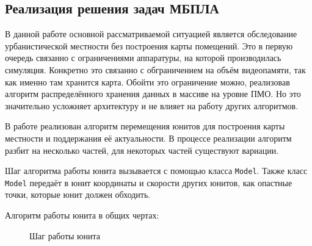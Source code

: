 \subsection{Реализация решения задач МБПЛА}

В данной работе основной рассматриваемой ситуацией является обследование
урбанистической местности без построения карты помещений. Это в первую
очередь связанно с ограничениями аппаратуры, на которой производилась 
симуляция. Конкретно это связанно с обграничением на объём видеопамяти,
так как именно там хранится карта. Обойти это ограничение можно, реализовав
алгоритм распределённого хранения данных в массиве на уровне ПМО. Но это
значительно усложняет архитектуру и не влияет на работу других алгоритмов.

В работе реализован алгоритм перемещения юнитов для построения карты
местности и поддержания её актуальности. В процессе реализации алгоритм
разбит на несколько частей, для некоторых частей существуют вариации.

Шаг алгоритма работы юнита вызывается с помощью класса \verb|Model|.
Также класс \verb|Model| передаёт в юнит координаты и скорости других
юнитов, как опастные точки, которые юнит должен обходить.

Алгоритм работы юнита в общих чертах:

\begin{figure}[h!]

    \centering


    \caption{Шаг работы юнита}
    \label{fig:unit_algo_min}
\end{figure}

